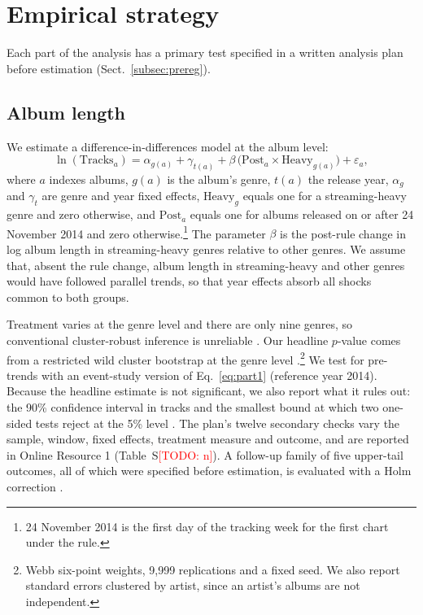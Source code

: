 \documentclass[pdflatex,sn-apa]{sn-jnl}
\newcommand{\todo}[1]{\textcolor{red}{[TODO: #1]}}
\begin{document}
\section{Empirical strategy}\label{sec:strategy}

Each part of the analysis has a primary test specified in a written analysis plan before estimation (Sect.~\ref{subsec:prereg}).

\subsection{Album length}\label{subsec:part1}
We estimate a difference-in-differences model at the album level:
\begin{equation}
\ln(\mathrm{Tracks}_{a}) = \alpha_{g(a)} + \gamma_{t(a)} + \beta\,\bigl(\mathrm{Post}_{a}\times \mathrm{Heavy}_{g(a)}\bigr) + \varepsilon_{a},
\label{eq:part1}
\end{equation}
where $a$ indexes albums, $g(a)$ is the album's genre, $t(a)$ the release year, $\alpha_g$ and $\gamma_t$ are genre and year fixed effects, $\mathrm{Heavy}_g$ equals one for a streaming-heavy genre and zero otherwise, and $\mathrm{Post}_a$ equals one for albums released on or after 24 November 2014 and zero otherwise.\footnote{24 November 2014 is the first day of the tracking week for the first chart under the rule.} The parameter $\beta$ is the post-rule change in log album length in streaming-heavy genres relative to other genres. We assume that, absent the rule change, album length in streaming-heavy and other genres would have followed parallel trends, so that year effects absorb all shocks common to both groups.

Treatment varies at the genre level and there are only nine genres, so conventional cluster-robust inference is unreliable \citep{cameron2008bootstrap,mackinnon2017wild}. Our headline $p$-value comes from a restricted wild cluster bootstrap at the genre level \citep{webb2023reworking}.\footnote{Webb six-point weights, 9,999 replications and a fixed seed. We also report standard errors clustered by artist, since an artist's albums are not independent.} We test for pre-trends with an event-study version of Eq.~\eqref{eq:part1} (reference year 2014). Because the headline estimate is not significant, we also report what it rules out: the 90\% confidence interval in tracks and the smallest bound at which two one-sided tests reject at the 5\% level \citep{hartman2018equivalence}. The plan's twelve secondary checks vary the sample, window, fixed effects, treatment measure and outcome, and are reported in Online Resource 1 (Table~S\todo{n}). A follow-up family of five upper-tail outcomes, all of which were specified before estimation, is evaluated with a Holm correction \citep{holm1979simple}.
\end{document}
